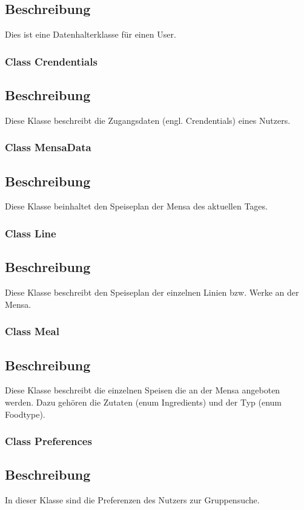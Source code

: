 \documentclass[a4paper]{scrreprt}
\begin{document}
\subsection*{Beschreibung}
Dies ist eine Datenhalterklasse für einen User.

\subsubsection{Class Crendentials}
\subsection*{Beschreibung}
Diese Klasse beschreibt die Zugangsdaten (engl. Crendentials) eines Nutzers.

\subsubsection{Class MensaData}
\subsection*{Beschreibung}
Diese Klasse beinhaltet den Speiseplan der Mensa des aktuellen Tages.

\subsubsection{Class Line}
\subsection*{Beschreibung}
Diese Klasse beschreibt den Speiseplan der einzelnen Linien bzw. Werke an der Mensa.

\subsubsection{Class Meal}
\subsection*{Beschreibung}
Diese Klasse beschreibt die einzelnen Speisen die an der Mensa angeboten werden.
Dazu gehören die Zutaten (enum Ingredients) und der Typ (enum Foodtype).

\subsubsection{Class Preferences}
\subsection*{Beschreibung}
In dieser Klasse sind die Preferenzen des Nutzers zur Gruppensuche.
\end{document}

